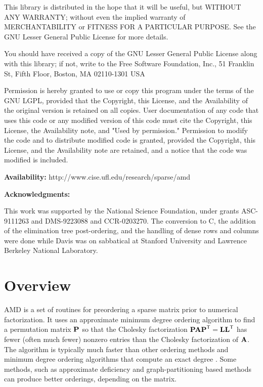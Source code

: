 \documentclass[11pt]{article}
\newcommand{\m}[1]{{\bf{#1}}}       %
\newcommand{\tr}{^{\sf T}}          %
\begin{document}
    This library is distributed in the hope that it will be useful,
    but WITHOUT ANY WARRANTY; without even the implied warranty of
    MERCHANTABILITY or FITNESS FOR A PARTICULAR PURPOSE.  See the GNU
    Lesser General Public License for more details.

    You should have received a copy of the GNU Lesser General Public
    License along with this library; if not, write to the Free Software
    Foundation, Inc., 51 Franklin St, Fifth Floor, Boston, MA  02110-1301
    USA

    Permission is hereby granted to use or copy this program under the
    terms of the GNU LGPL, provided that the Copyright, this License,
    and the Availability of the original version is retained on all copies.
    User documentation of any code that uses this code or any modified
    version of this code must cite the Copyright, this License, the
    Availability note, and "Used by permission." Permission to modify
    the code and to distribute modified code is granted, provided the
    Copyright, this License, and the Availability note are retained,
    and a notice that the code was modified is included.

{\bf Availability:}
    http://www.cise.ufl.edu/research/sparse/amd

{\bf Acknowledgments:}

    This work was supported by the National Science Foundation, under
    grants ASC-9111263 and DMS-9223088 and CCR-0203270.
    The conversion to C, the addition of the elimination tree
    post-ordering, and the handling of dense rows and columns
    were done while Davis was on sabbatical at
    Stanford University and Lawrence Berkeley National Laboratory.

\newpage
\section{Overview}

AMD is a set of routines for preordering a sparse matrix prior to
numerical factorization.  It uses an approximate minimum degree ordering
algorithm \cite{AmestoyDavisDuff96,AmestoyDavisDuff04}
to find a permutation matrix $\m{P}$
so that the Cholesky factorization $\m{PAP}\tr=\m{LL}\tr$ has fewer
(often much fewer) nonzero entries than the Cholesky factorization of $\m{A}$.
The algorithm is typically much faster than other ordering methods
and  minimum degree ordering
algorithms that compute an exact degree \cite{GeorgeLiu89}.
Some methods, such as approximate deficiency
\cite{RothbergEisenstat98} and graph-partitioning based methods
\cite{Chaco,KarypisKumar98e,PellegriniRomanAmestoy00,schu:01}
can produce better orderings, depending on the matrix.
\end{document}

